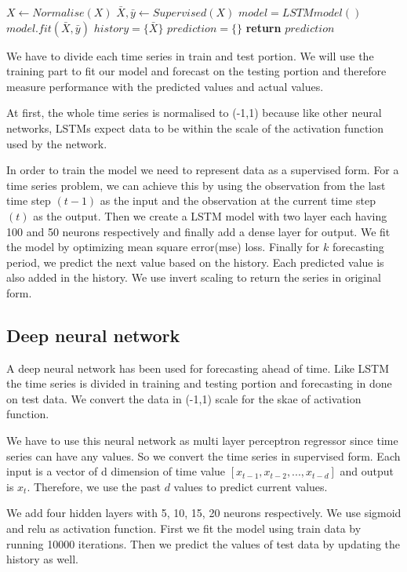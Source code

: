 \begin{algorithm}
	\DontPrintSemicolon
	\SetAlgoLined
	\caption{$LSTM(X,k)$}
	\label{algo:lstm}
	
	$X \leftarrow Normalise(X)$  \;
	$\bar{X},\bar{y} \leftarrow Supervised(X)$   \;
	$model = LSTMmodel()$ \;
	$model.fit(\bar{X},\bar{y})$ \;
	$history = \{\bar{X}\}$ \;
	$prediction=\{\}$ \;
	\textbf{return} $prediction$  \;
	

\end{algorithm} 
 We have to divide each time series in train and test portion. We will use the training part to fit our model and forecast on the testing portion and therefore measure performance with the predicted values and actual values. 

 At first, the whole time series is normalised to (-1,1) because like other neural networks, LSTMs expect data to be within the scale of the activation function used by the network. 

In order to train the model we need to represent data as a supervised form. For a time series problem, we can achieve this by using the observation from the last time step $(t-1)$ as the input and the observation at the current time step $(t)$ as the output. Then we create a LSTM model with two layer each having 100 and 50 neurons respectively and finally add a dense layer for output. We fit the model by optimizing mean square error(mse) loss. Finally for $k$ forecasting period, we predict the next value based on the history. Each predicted value is also added in the history. We use invert scaling to return the series in original form.


\subsection{Deep neural network}

 A deep neural network has been used for forecasting ahead of time. Like LSTM the time series is divided in training and testing portion and forecasting in done on test data. We convert the data in (-1,1) scale for the skae of activation function.

We have to  use this neural network as multi layer perceptron regressor since time series can have any values. So we convert the time series in supervised form. Each input is a vector of d dimension of time value $[x_{t-1},x_{t-2},...,x_{t-d}]$ and output is $x_t$. Therefore, we use the past $d$ values to predict current values. 

We add four hidden layers with  5, 10, 15, 20 neurons respectively. We use sigmoid and relu as activation function. First we fit the model using train data by running 10000 iterations. Then we predict the values of test data by updating the history as well.


